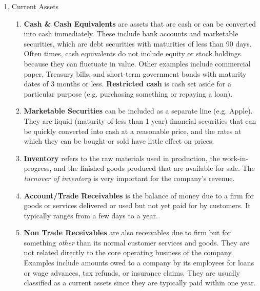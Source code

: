 \documentclass{article}
\begin{document}
    \begin{enumerate}
    \item Current Assets
    \begin{enumerate}
      \item \textbf{Cash \& Cash Equivalents} are assets that are cash or can be converted into cash immediately. These include bank accounts and marketable securities, which are debt securities with maturities of less than 90 days. Often times, cash equivalents do not include equity or stock holdings because they can fluctuate in value. Other examples include commercial paper, Treasury bills, and short-term government bonds with maturity dates of 3 months or less. \textbf{Restricted cash} is cash set aside for a particular purpose (e.g. purchasing something or repaying a loan).
      \item \textbf{Marketable Securities} can be included as a separate line (e.g. Apple). They are liquid (maturity of less than 1 year) financial securities that can be quickly converted into cash at a reasonable price, and the rates at which they can be bought or sold have little effect on prices.
      \item \textbf{Inventory} refers to the raw materials used in production, the work-in-progress, and the finished goods produced that are available for sale. The \textit{turnover of inventory} is very important for the company's revenue.
      \item \textbf{Account/Trade Receivables} is the balance of money due to a firm for goods or services delivered or used but not yet paid for by customers. It typically ranges from a few days to a year.
      \item \textbf{Non Trade Receivables} are also receivables due to firm but for something \textit{other} than its normal customer services and goods. They are not related directly to the core operating business of the company. Examples include amounts owed to a company by its employees for loans or wage advances, tax refunds, or insurance claims. They are usually classified as a current assets since they are typically paid within one year.


\end{enumerate}
\end{enumerate}
\end{document}
